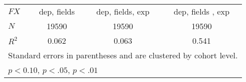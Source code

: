 \begin{table}[ht]
{\begin{tabular}{l*{3}{c}}
\hline
\(FX \)       &       dep, fields          &       dep, fields, exp          &       dep, fields , exp         \\
\(N\)       &       19590         &       19590         &       19590         \\
\(R^{2}\)   &       0.062         &       0.063         &       0.541         \\
\hline\hline
\multicolumn{4}{l}{\footnotesize Standard errors in parentheses and are clustered by cohort level.}\\
\multicolumn{4}{l}{\footnotesize \sym{*} \(p<0.10\), \sym{**} \(p<.05\), \sym{***} \(p<.01\)}\\
\end{tabular}%
}
\end{table}